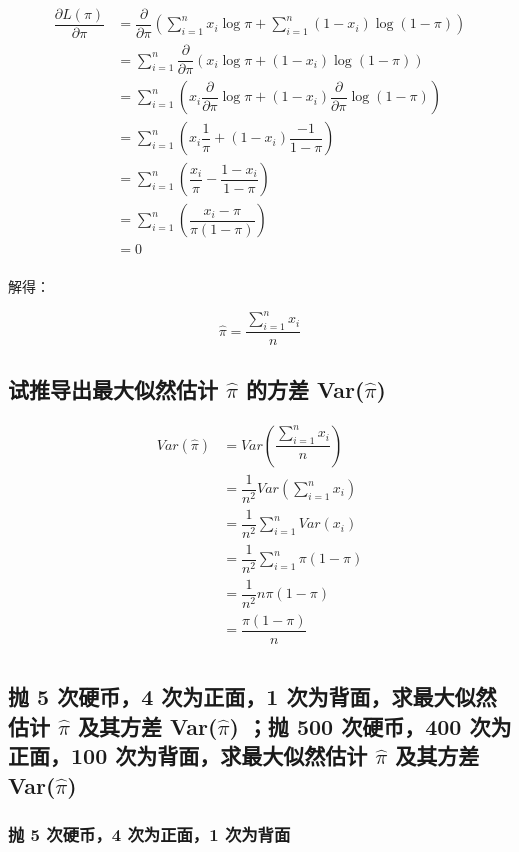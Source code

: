\documentclass[]{article}
\newcommand\df[2]{\dfrac{#1}{#2}}
\newcommand\pdf[2]{\dfrac{\partial#1}{\partial#2}}
\begin{document}
\begin{equation}
    \begin{aligned}
        \pdf{L(\pi)}{\pi}
        &=\pdf{}{\pi}(\sum_{i=1}^nx_i\log\pi+\sum_{i=1}^n(1-x_i)\log(1-\pi))\\
        &=\sum_{i=1}^n\pdf{}{\pi}(x_i\log\pi+(1-x_i)\log(1-\pi))\\
        &=\sum_{i=1}^n(x_i\pdf{}{\pi}\log\pi+(1-x_i)\pdf{}{\pi}\log(1-\pi))\\
        &=\sum_{i=1}^n(x_i\df{1}{\pi}+(1-x_i)\df{-1}{1-\pi})\\
        &=\sum_{i=1}^n(\df{x_i}{\pi}-\df{1-x_i}{1-\pi})\\
        &=\sum_{i=1}^n(\df{x_i-\pi}{\pi(1-\pi)})\\
        &=0\\
    \end{aligned}
\end{equation}

解得：

$$\hat{\pi}=\df{\sum_{i=1}^nx_i}{n}$$

\subsection{试推导出最大似然估计 $\hat{\pi}$ 的方差 Var($\hat{\pi}$)}

\begin{equation}
    \begin{aligned}
        Var(\hat{\pi})
        &=Var(\df{\sum_{i=1}^nx_i}{n})\\
        &=\df{1}{n^2}Var(\sum_{i=1}^nx_i)\\
        &=\df{1}{n^2}\sum_{i=1}^nVar(x_i)\\
        &=\df{1}{n^2}\sum_{i=1}^n\pi(1-\pi)\\
        &=\df{1}{n^2}n\pi(1-\pi)\\
        &=\df{\pi(1-\pi)}{n}\\
    \end{aligned}
\end{equation}

\subsection{抛 5 次硬币，4 次为正面，1 次为背面，求最大似然估计 $\hat{\pi}$ 及其方差 Var($\hat{\pi}$) ；抛 500 次硬币，400 次为正面，100 次为背面，求最大似然估计 $\hat{\pi}$ 及其方差 Var($\hat{\pi}$) }

\subsubsection{抛 5 次硬币，4 次为正面，1 次为背面}
\end{document}
